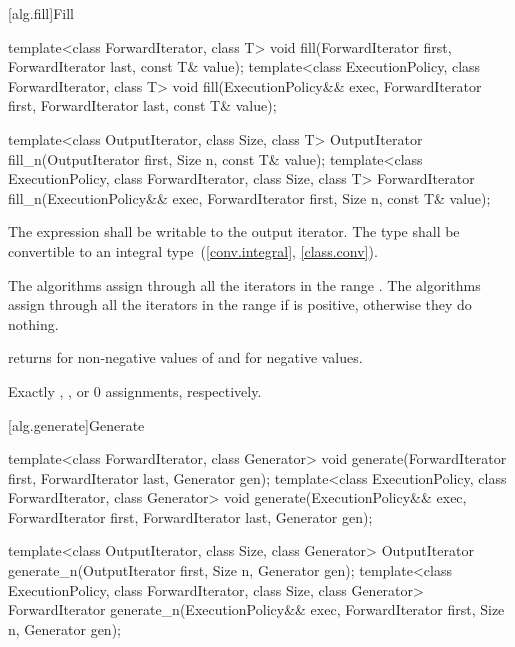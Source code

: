 [alg.fill]{Fill}

%
%
\begin{itemdecl}
template<class ForwardIterator, class T>
  void fill(ForwardIterator first, ForwardIterator last, const T& value);
template<class ExecutionPolicy, class ForwardIterator, class T>
  void fill(ExecutionPolicy&& exec,
            ForwardIterator first, ForwardIterator last, const T& value);

template<class OutputIterator, class Size, class T>
  OutputIterator fill_n(OutputIterator first, Size n, const T& value);
template<class ExecutionPolicy, class ForwardIterator, class Size, class T>
  ForwardIterator fill_n(ExecutionPolicy&& exec,
                         ForwardIterator first, Size n, const T& value);

\end{itemdecl}

\begin{itemdescr}
\pnum
\requires
The expression
shall be writable to the output iterator. The type
shall be convertible to an integral type~(\ref{conv.integral}, \ref{class.conv}).

\pnum
\effects
The  algorithms assign  through all the iterators in the range
. The  algorithms assign 
through all the iterators in the range 
if  is positive, otherwise they do nothing.

\pnum
\returns {} returns  for non-negative values of 
and  for negative values.

\pnum
\complexity
Exactly
,
, or 0 assignments, respectively.
\end{itemdescr}

[alg.generate]{Generate}

%
%
\begin{itemdecl}
template<class ForwardIterator, class Generator>
  void generate(ForwardIterator first, ForwardIterator last,
                Generator gen);
template<class ExecutionPolicy, class ForwardIterator, class Generator>
  void generate(ExecutionPolicy&& exec,
                ForwardIterator first, ForwardIterator last,
                Generator gen);

template<class OutputIterator, class Size, class Generator>
  OutputIterator generate_n(OutputIterator first, Size n, Generator gen);
template<class ExecutionPolicy, class ForwardIterator, class Size, class Generator>
  ForwardIterator generate_n(ExecutionPolicy&& exec,
                             ForwardIterator first, Size n, Generator gen);
\end{itemdecl}

